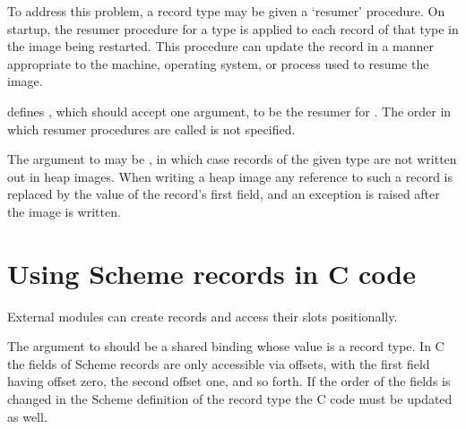 To address this problem, a record type may be given a `resumer'
 procedure.
On startup, the resumer procedure for a type is applied to each record of
 that type in the image being restarted.
This procedure can update the record in a manner appropriate to
 the machine, operating system, or process used to resume the
 image.

\begin{protos}
\end{protos}

\noindent{} defines ,
 which should accept one argument, to be the resumer for
 .
The order in which resumer procedures are called is not specified.

The  argument to  may
 be , in which case records of the given type are
 not written out in heap images.
When writing a heap image any reference to such a record is replaced by
 the value of the record's first field, and an exception is raised
 after the image is written.

\section{Using Scheme records in C code}

External modules can create records and access their slots
 positionally.

\begin{protos}
\end{protos}
%
The argument to  should be a shared binding
 whose value is a record type.
In C the fields of Scheme records are only accessible via offsets,
 with the first field having offset zero, the second offset one, and
 so forth.
If the order of the fields is changed in the Scheme definition of the
 record type the C code must be updated as well.

